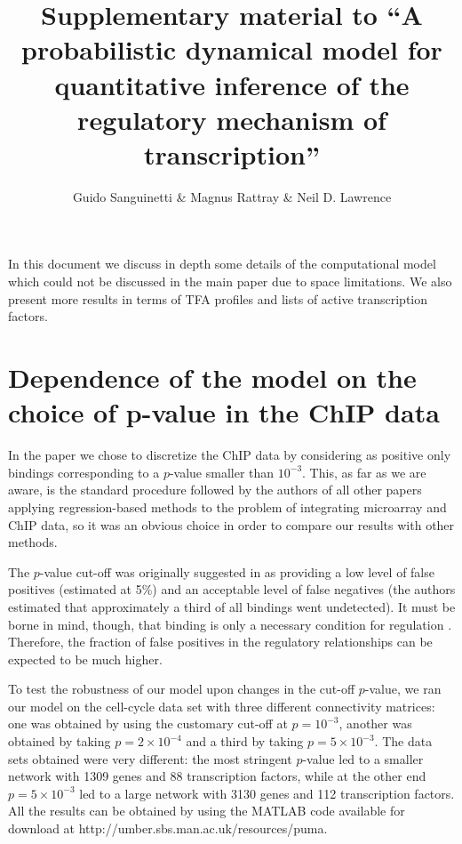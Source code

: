 \documentclass[english]{sheftech}
\begin{document}
\title{Supplementary material to ``A probabilistic dynamical model for 
quantitative inference of the regulatory mechanism of transcription''}
\author{Guido Sanguinetti & Magnus Rattray & Neil D. Lawrence}

\maketitle
In this document we discuss in depth some details of the computational model
which could not be discussed in the main paper due to space limitations. We 
also present more results in terms of TFA profiles and lists of active 
transcription factors.

\section{Dependence of the model on the choice of p-value in the ChIP data}

In the paper we chose to discretize the ChIP data by considering as
positive only bindings corresponding to a $p$-value smaller than
$10^{-3}$. This, as far as we are aware, is the standard procedure
followed by the authors of all other papers applying regression-based
methods to the problem of integrating microarray and ChIP data, so
it was an obvious choice in order to compare our results with other
methods.

The $p$-value cut-off was originally suggested in \cite{Lee02} as
providing a low level of false positives (estimated at 5\%) and an
acceptable level of false negatives (the authors estimated that approximately
a third of all bindings went undetected). It must be borne in mind,
though, that binding is only a necessary condition for regulation 
\citep{Martone03}.
Therefore, the fraction of false positives in the regulatory relationships
can be expected to be much higher.

To test the robustness of our model upon changes in the cut-off $p$-value,
we ran our model on the cell-cycle data set with three different connectivity
matrices: one was obtained by using the customary cut-off at $p=10^{-3}$,
another was obtained by taking $p=2\times10^{-4}$ and a third by
taking $p=5\times10^{-3}$. The data sets obtained were very different:
the most stringent $p$-value led to a smaller network with 1309 genes
and 88 transcription factors, while at the other end $p=5\times10^{-3}$
led to a large network with 3130 genes and 112 transcription factors.
All the results can be obtained by using the MATLAB code available
for download at http://umber.sbs.man.ac.uk/resources/puma.
\end{document}
